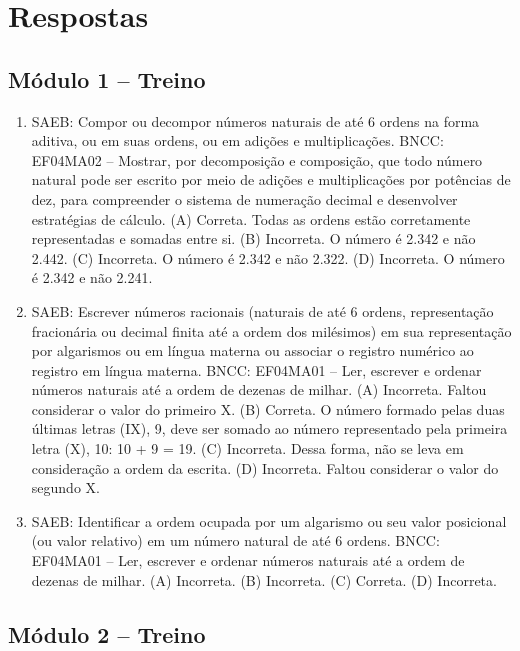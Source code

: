\chapter{Respostas}
\pagestyle{plain}
\footnotesize

\pagecolor{gray!40}

\section*{Módulo 1 – Treino}

\begin{enumerate}
\item
SAEB: Compor ou decompor números naturais de até 6 ordens na forma aditiva, ou em suas ordens, ou em adições e multiplicações.
BNCC: EF04MA02 -- Mostrar, por decomposição e composição, que todo número natural pode ser escrito
por meio de adições e multiplicações por potências de dez, para compreender o sistema de
numeração decimal e desenvolver estratégias de cálculo.
(A) Correta. Todas as ordens estão corretamente representadas e somadas entre si.
(B) Incorreta. O número é 2.342 e não 2.442.
(C) Incorreta. O número é 2.342 e não 2.322.
(D) Incorreta. O número é 2.342 e não 2.241.

\item
SAEB: Escrever números racionais (naturais de até 6 ordens, representação fracionária ou decimal finita até a ordem dos milésimos) em sua representação por algarismos ou em língua materna ou associar o registro numérico ao registro em língua materna.
BNCC: EF04MA01 -- Ler, escrever e ordenar números naturais até a ordem de dezenas de milhar.
(A)  Incorreta. Faltou considerar o valor do primeiro X.
(B)  Correta. O número formado pelas duas últimas letras (IX), 9, deve ser somado ao número representado pela primeira letra (X), 10: 10 + 9 = 19.
(C)  Incorreta. Dessa forma, não se leva em consideração a ordem da escrita.
(D)  Incorreta. Faltou considerar o valor do segundo X.

\item
SAEB: Identificar a ordem ocupada por um algarismo ou seu valor posicional (ou valor relativo) em um número natural de até 6 ordens.
BNCC: EF04MA01 -- Ler, escrever e ordenar números naturais até a ordem de dezenas de milhar.
(A)  Incorreta. 
(B)  Incorreta. 
(C)  Correta. 
(D)  Incorreta. 
\end{enumerate}

\section*{Módulo 2 – Treino}

